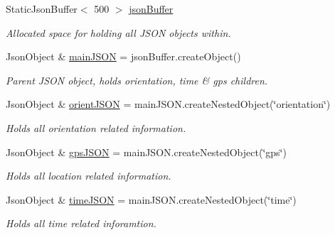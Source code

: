 \begin{DoxyCompactItemize}
Static\+Json\+Buffer$<$ 500 $>$ \hyperlink{logging-device_8ino_ae3799d2cbf8f13e21cbaef64b75c6833}{json\+Buffer}
\begin{DoxyCompactList}\small\item\em Allocated space for holding all J\+S\+ON objects within. \end{DoxyCompactList}\item 
\mbox{\label{logging-device_8ino_a5eebfb3b76a83174d0f5d032d1f6bfb7}} 
Json\+Object \& \hyperlink{logging-device_8ino_a5eebfb3b76a83174d0f5d032d1f6bfb7}{main\+J\+S\+ON} = json\+Buffer.\+create\+Object()
\begin{DoxyCompactList}\small\item\em Parent J\+S\+ON object, holds orientation, time \& gps children. \end{DoxyCompactList}\item 
\mbox{\label{logging-device_8ino_ae8e95a76df2aaa373792e5b744a6bb73}} 
Json\+Object \& \hyperlink{logging-device_8ino_ae8e95a76df2aaa373792e5b744a6bb73}{orient\+J\+S\+ON} = main\+J\+S\+O\+N.\+create\+Nested\+Object(\char`\"{}orientation\char`\"{})
\begin{DoxyCompactList}\small\item\em Holds all orientation related information. \end{DoxyCompactList}\item 
\mbox{\label{logging-device_8ino_a548727e041a5cd3db91bdbd0ccd71e30}} 
Json\+Object \& \hyperlink{logging-device_8ino_a548727e041a5cd3db91bdbd0ccd71e30}{gps\+J\+S\+ON} = main\+J\+S\+O\+N.\+create\+Nested\+Object(\char`\"{}gps\char`\"{})
\begin{DoxyCompactList}\small\item\em Holds all location related information. \end{DoxyCompactList}\item 
\mbox{\label{logging-device_8ino_acc172a29cb5ff709b48b650d9fb6503c}} 
Json\+Object \& \hyperlink{logging-device_8ino_acc172a29cb5ff709b48b650d9fb6503c}{time\+J\+S\+ON} = main\+J\+S\+O\+N.\+create\+Nested\+Object(\char`\"{}time\char`\"{})
\begin{DoxyCompactList}\small\item\em Holds all time related inforamtion. \end{DoxyCompactList}\end{DoxyCompactItemize}


